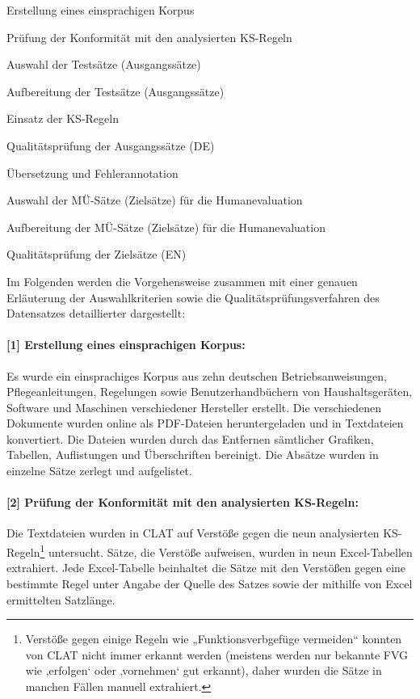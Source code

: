 \begin{enumerate}[label = {[\arabic*]}, align = left]
\item Erstellung eines einsprachigen Korpus
\item Prüfung der Konformität mit den analysierten KS-Regeln
\item Auswahl der Testsätze (Ausgangssätze)
\item Aufbereitung der Testsätze (Ausgangssätze)
\item Einsatz der KS-Regeln
\item Qualitätsprüfung der Ausgangssätze (DE)
\item Übersetzung und Fehlerannotation
\item Auswahl der MÜ-Sätze (Zielsätze) für die Humanevaluation
\item Aufbereitung der MÜ-Sätze (Zielsätze) für die Humanevaluation
\item Qualitätsprüfung der Zielsätze (EN)
\end{enumerate}

Im Folgenden werden die Vorgehensweise zusammen mit einer genauen Erläuterung der Auswahlkriterien sowie die Qualitätsprüfungsverfahren des Datensatzes detaillierter dargestellt:

\paragraph*{[1] Erstellung eines einsprachigen Korpus:} Es wurde ein einsprachiges Korpus aus zehn deutschen Betriebsanweisungen, Pflegeanleitungen, Regelungen sowie Benutzerhandbüchern von Haushaltsgeräten, Software und Maschinen verschiedener Hersteller erstellt. Die verschiedenen Dokumente wurden online als PDF-Dateien heruntergeladen und in Textdateien konvertiert. Die Dateien wurden durch das Entfernen sämtlicher Grafiken, Tabellen, Auflistungen und Überschriften bereinigt. Die Absätze wurden in einzelne Sätze zerlegt und aufgelistet.

\paragraph*{[2] Prüfung der Konformität mit den analysierten KS-Regeln:} Die Textdateien wurden in CLAT auf Verstöße gegen die neun analysierten KS-Regeln\footnote{{{{Verstöße gegen einige Regeln wie „Funktionsverbgefüge vermeiden“ konnten von CLAT nicht immer erkannt werden (meistens werden nur bekannte FVG wie ‚erfolgen‘ oder ‚vornehmen‘ gut erkannt), daher wurden die Sätze in manchen Fällen manuell extrahiert.}}}} untersucht. Sätze, die Verstöße aufweisen, wurden in neun Excel-Tabellen extrahiert. Jede Excel-Tabelle beinhaltet die Sätze mit den Verstößen gegen eine bestimmte Regel unter Angabe der Quelle des Satzes sowie der mithilfe von Excel ermittelten Satzlänge.

